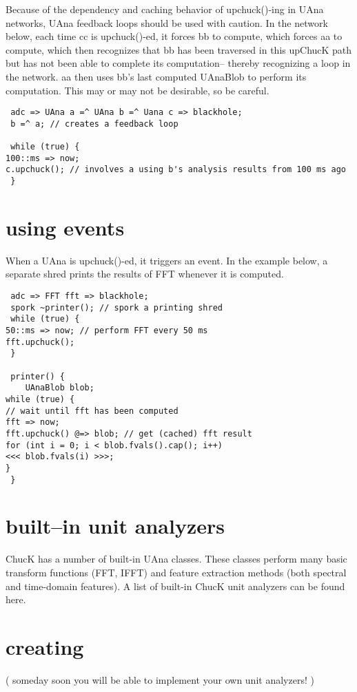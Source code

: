 Because of the dependency and caching behavior of upchuck()-ing in UAna
networks, UAna feedback loops should be used with caution. In the network
below, each time cc is upchuck()-ed, it forces bb to compute, which forces aa to
compute, which then recognizes that bb has been traversed in this upChucK path
but has not been able to complete its computation-- thereby recognizing a loop
in the network. aa then uses bb's last computed UAnaBlob to perform its
computation. This may or may not be desirable, so be careful.

\begin{verbatim}
 adc => UAna a =^ UAna b =^ Uana c => blackhole;
 b =^ a; // creates a feedback loop

 while (true) {
100::ms => now;
c.upchuck(); // involves a using b's analysis results from 100 ms ago
 }
\end{verbatim}

\section{using events} 
When a UAna is upchuck()-ed, it triggers an event. In the example below, a
separate shred prints the results of FFT whenever it is computed.

\begin{verbatim}
 adc => FFT fft => blackhole;
 spork ~printer(); // spork a printing shred
 while (true) {
50::ms => now; // perform FFT every 50 ms
fft.upchuck();
 }

 printer() {
 	UAnaBlob blob;
while (true) {
// wait until fft has been computed
fft => now;
fft.upchuck() @=> blob; // get (cached) fft result
for (int i = 0; i < blob.fvals().cap(); i++)
<<< blob.fvals(i) >>>;
}	
 }
\end{verbatim}

\section{built--in unit analyzers} 
ChucK has a number of built-in UAna classes. These classes perform many basic
transform functions (FFT, IFFT) and feature extraction methods (both spectral
and time-domain features). A list of built-in ChucK unit analyzers can be found
here.
\section{creating} 
( someday soon you will be able to implement your own unit analyzers! )
